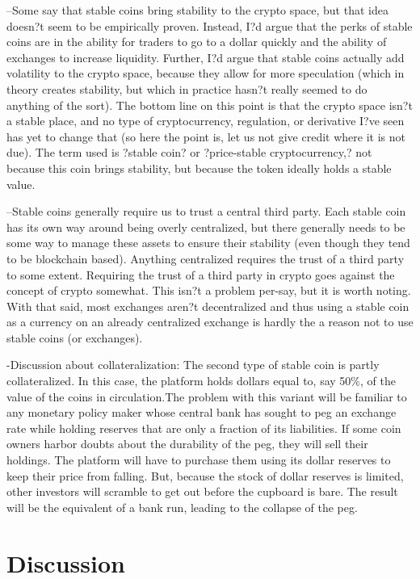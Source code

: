 --Some say that stable coins bring stability to the crypto space, but that idea doesn?t seem to be empirically proven. Instead, I?d argue that the perks of stable coins are in the ability for traders to go to a dollar quickly and the ability of exchanges to increase liquidity. Further, I?d argue that stable coins actually add volatility to the crypto space, because they allow for more speculation (which in theory creates stability, but which in practice hasn?t really seemed to do anything of the sort). The bottom line on this point is that the crypto space isn?t a stable place, and no type of cryptocurrency, regulation, or derivative I?ve seen has yet to change that (so here the point is, let us not give credit where it is not due). The term used is ?stable coin? or ?price-stable cryptocurrency,? not because this coin brings stability, but because the token ideally holds a stable value.

--Stable coins generally require us to trust a central third party. Each stable coin has its own way around being overly centralized, but there generally needs to be some way to manage these assets to ensure their stability (even though they tend to be blockchain based). Anything centralized requires the trust of a third party to some extent. Requiring the trust of a third party in crypto goes against the concept of crypto somewhat. This isn?t a problem per-say, but it is worth noting. With that said, most exchanges aren?t decentralized and thus using a stable coin as a currency on an already centralized exchange is hardly the a reason not to use stable coins (or exchanges).

-Discussion about collateralization: The second type of stable coin is partly collateralized. In this case, the platform holds dollars equal to, say 50\%, of the value of the coins in circulation.The problem with this variant will be familiar to any monetary policy maker whose central bank has sought to peg an exchange rate while holding reserves that are only a fraction of its liabilities.
If some coin owners harbor doubts about the durability of the peg, they will sell their holdings. The platform will have to purchase them using its dollar reserves to keep their price from falling. But, because the stock of dollar reserves is limited, other investors will scramble to get out before the cupboard is bare. The result will be the equivalent of a bank run, leading to the collapse of the peg.

\section{Discussion}


